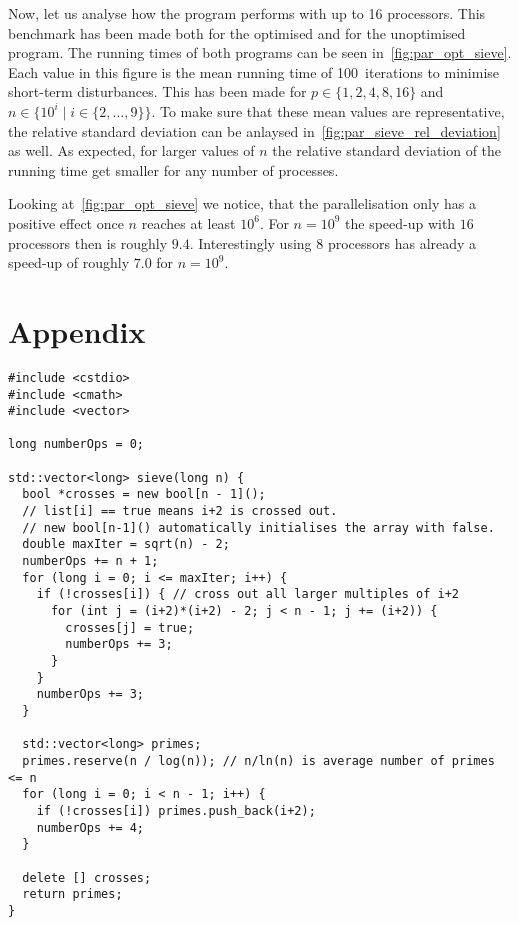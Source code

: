 \documentclass[a4paper,12pt]{article}
\begin{document}
Now, let us analyse how the program performs with up to 16 processors.
This benchmark has been made both for the optimised and for the unoptimised program.
The running times of both programs can be seen in~\autoref{fig:par_opt_sieve}.
Each value in this figure is the mean running time of 100~iterations to minimise short-term disturbances.
This has been made for $p\in\{1,2,4,8,16\}$ and $n\in\{10^i\mid i\in\{2,\dots,9\} \}$.
To make sure that these mean values are representative, the relative standard deviation can be anlaysed in~\autoref{fig:par_sieve_rel_deviation} as well.
As expected, for larger values of $n$ the relative standard deviation of the running time get smaller for any number of processes.

Looking at~\autoref{fig:par_opt_sieve} we notice, that the parallelisation only has a positive effect once $n$ reaches at least $10^6$.
For $n=10^9$ the speed-up with $16$ processors then is roughly $9.4$.
Interestingly using $8$ processors has already a speed-up of roughly $7.0$ for $n=10^9$.


\pagebreak
\appendix
\section{Appendix}

 	\begin{lstlisting}[caption={Sequential implementation of the Sieve of Eratosthenes}, label={prg:seq_sieve}, frame={single}]
#include <cstdio>
#include <cmath>
#include <vector>

long numberOps = 0;

std::vector<long> sieve(long n) {
  bool *crosses = new bool[n - 1]();
  // list[i] == true means i+2 is crossed out.
  // new bool[n-1]() automatically initialises the array with false.
  double maxIter = sqrt(n) - 2;
  numberOps += n + 1;
  for (long i = 0; i <= maxIter; i++) {
    if (!crosses[i]) { // cross out all larger multiples of i+2
      for (int j = (i+2)*(i+2) - 2; j < n - 1; j += (i+2)) {
        crosses[j] = true;
        numberOps += 3;
      }
    }
    numberOps += 3;
  }

  std::vector<long> primes;
  primes.reserve(n / log(n)); // n/ln(n) is average number of primes <= n
  for (long i = 0; i < n - 1; i++) {
    if (!crosses[i]) primes.push_back(i+2);
    numberOps += 4;
  }

  delete [] crosses;
  return primes;
}
	\end{lstlisting}
\end{document}
